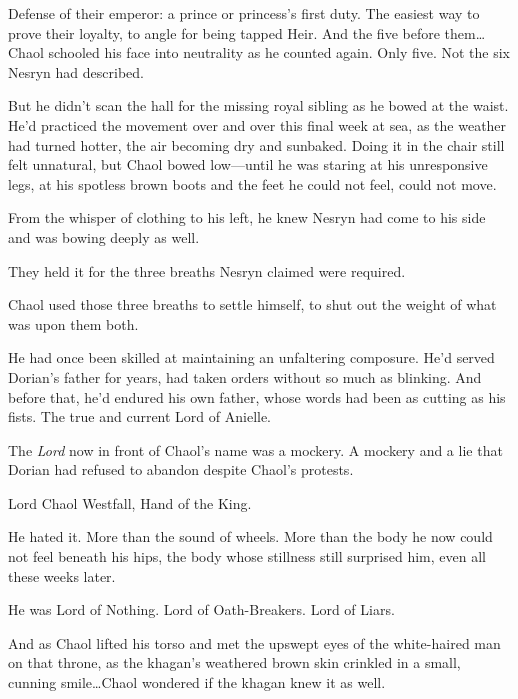 Defense of their emperor: a prince or princess's first duty.
The easiest way to prove their loyalty, to angle for being tapped Heir.
And the five before them\ldots Chaol schooled his face into neutrality as he counted again.
Only five.
Not the six Nesryn had described.

But he didn't scan the hall for the missing royal sibling as he bowed at the waist.
He'd practiced the movement over and over this final week at sea, as the weather had turned hotter, the air becoming dry and sunbaked.
Doing it in the chair still felt unnatural, but Chaol bowed low---until he was staring at his unresponsive legs, at his spotless brown boots and the feet he could not feel, could not move.

From the whisper of clothing to his left, he knew Nesryn had come to his side and was bowing deeply as well.

They held it for the three breaths Nesryn claimed were required.

Chaol used those three breaths to settle himself, to shut out the weight of what was upon them both.

He had once been skilled at maintaining an unfaltering composure.
He'd served Dorian's father for years, had taken orders without so much as blinking.
And before that, he'd endured his own father, whose words had been as cutting as his fists.
The true and current Lord of Anielle.

The \emph{Lord} now in front of Chaol's name was a mockery.
A mockery and a lie that Dorian had refused to abandon despite Chaol's protests.

Lord Chaol Westfall, Hand of the King.

He hated it.
More than the sound of wheels.
More than the body he now could not feel beneath his hips, the body whose stillness still surprised him, even all these weeks later.

He was Lord of Nothing.
Lord of Oath-Breakers.
Lord of Liars.

And as Chaol lifted his torso and met the upswept eyes of the white-haired man on that throne, as the khagan's weathered brown skin crinkled in a small, cunning smile\ldots Chaol wondered if the khagan knew it as well.

